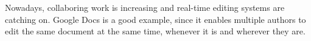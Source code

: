 Nowadays, collaboring work is increasing and real-time editing systems are catching on. Google Docs is a good example, since it enables multiple authors to edit the same document at the same time, whenever it is and wherever they are.